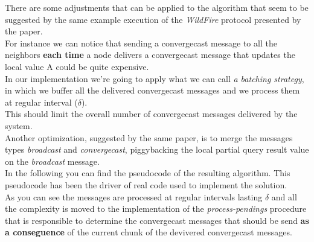 \documentclass{article}
\begin{document}
There are some adjustments that can be applied to the algorithm that seem to be suggested by the same example execution of the \emph{WildFire} protocol presented by the paper. \\
For instance we can notice that sending a convergecast message to all the neighbors \textbf{each time} a node delivers a convergecast message that updates the local value A could be quite expensive. \\
In our implementation we're going to apply what we can call \emph{a batching strategy}, in which we buffer all the delivered convergecast messages and we process them at regular interval ($\delta$). \\
This should limit the overall number of convergecast messages delivered by the system. \\
Another optimization, suggested by the same paper, is to merge the messages types \emph{broadcast} and \emph{convergecast}, piggybacking the local partial query result value on the \emph{broadcast} message. \\
In the following you can find the pseudocode of the resulting algorithm. This pseudocode has been the driver of real code used to implement the solution. \\
As you can see the messages are processed at regular intervals lasting $\delta$ and all the complexity is moved to the implementation of the \emph{process-pendings} procedure that is responsible to determine the convergecast messages that should be send \textbf{as a conseguence} of the current chunk of the devivered convergecast messages.
\end{document}
